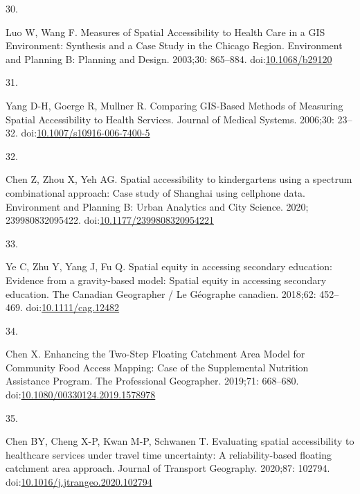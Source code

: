 \documentclass[10pt,letterpaper]{article}
\newlength{\cslhangindent}
\newlength{\csllabelwidth}
\newlength{\cslentryspacingunit} %
\newenvironment{CSLReferences}[2] %
 {%
  \setlength{\parindent}{0pt}
  \ifodd #1
  \let\oldpar\par
  \def\par{\hangindent=\cslhangindent\oldpar}
  \fi
  \setlength{\parskip}{#2\cslentryspacingunit}
 }%
 {}
\newcommand{\CSLLeftMargin}[1]{\parbox[t]{\csllabelwidth}{#1}}
\newcommand{\CSLRightInline}[1]{\parbox[t]{\linewidth - \csllabelwidth}{#1}\break}
\begin{document}
\begin{CSLReferences}{0}{0}
\leavevmode{}%
\CSLLeftMargin{30. }%
\CSLRightInline{Luo W, Wang F. Measures of Spatial Accessibility to
Health Care in a GIS Environment: Synthesis and a Case Study in the
Chicago Region. Environment and Planning B: Planning and Design.
2003;30: 865--884.
doi:\href{https://doi.org/10.1068/b29120}{10.1068/b29120}}

\leavevmode{}%
\CSLLeftMargin{31. }%
\CSLRightInline{Yang D-H, Goerge R, Mullner R. Comparing {GIS}-{Based}
{Methods} of {Measuring} {Spatial} {Accessibility} to {Health}
{Services}. Journal of Medical Systems. 2006;30: 23--32.
doi:\href{https://doi.org/10.1007/s10916-006-7400-5}{10.1007/s10916-006-7400-5}}

\leavevmode{}%
\CSLLeftMargin{32. }%
\CSLRightInline{Chen Z, Zhou X, Yeh AG. Spatial accessibility to
kindergartens using a spectrum combinational approach: {Case} study of
{Shanghai} using cellphone data. Environment and Planning B: Urban
Analytics and City Science. 2020; 239980832095422.
doi:\href{https://doi.org/10.1177/2399808320954221}{10.1177/2399808320954221}}

\leavevmode{}%
\CSLLeftMargin{33. }%
\CSLRightInline{Ye C, Zhu Y, Yang J, Fu Q. Spatial equity in accessing
secondary education: {Evidence} from a gravity-based model: {Spatial}
equity in accessing secondary education. The Canadian Geographer / Le
Géographe canadien. 2018;62: 452--469.
doi:\href{https://doi.org/10.1111/cag.12482}{10.1111/cag.12482}}

\leavevmode{}%
\CSLLeftMargin{34. }%
\CSLRightInline{Chen X. Enhancing the {Two}-{Step} {Floating}
{Catchment} {Area} {Model} for {Community} {Food} {Access} {Mapping}:
{Case} of the {Supplemental} {Nutrition} {Assistance} {Program}. The
Professional Geographer. 2019;71: 668--680.
doi:\href{https://doi.org/10.1080/00330124.2019.1578978}{10.1080/00330124.2019.1578978}}

\leavevmode{}%
\CSLLeftMargin{35. }%
\CSLRightInline{Chen BY, Cheng X-P, Kwan M-P, Schwanen T. Evaluating
spatial accessibility to healthcare services under travel time
uncertainty: {A} reliability-based floating catchment area approach.
Journal of Transport Geography. 2020;87: 102794.
doi:\href{https://doi.org/10.1016/j.jtrangeo.2020.102794}{10.1016/j.jtrangeo.2020.102794}}


\end{CSLReferences}
\end{document}
